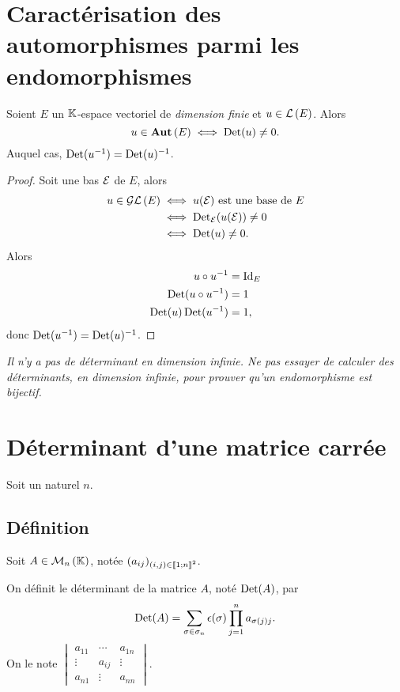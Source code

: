 \section{Caractérisation des automorphismes parmi les endomorphismes}
%
\begin{theo}
  Soient \(E\) un \(\mathbb{K}\)-espace vectoriel de \emph{dimension finie} et \(u\in
  \mathcal{L}\left(E\right)\). Alors
  \begin{equation}
    u \in \mathbf{Aut}\left(E\right) \iff \operatorname{Det}(u) \neq 0.
  \end{equation}
  Auquel cas, \(\operatorname{Det}(u^{-1}) = \operatorname{Det}(u)^{-1}\).
\end{theo}
\begin{proof}
  Soit une bas \(\mathcal{E}\) de \(E\), alors
  \begin{align}
    u \in \mathcal{GL}\left(E\right) &\iff u(\mathcal{E}) \text{~est une base de~} E \\
    &\iff \operatorname{Det}_{\mathcal{E}}(u(\mathcal{E})) \neq 0 \\
    &\iff \operatorname{Det}(u) \neq 0.
  \end{align}
  Alors
  \begin{align}
    u \circ u^{-1} &= \operatorname{Id}_E \\
    \operatorname{Det}(u \circ u^{-1}) &=1\\
    \operatorname{Det}(u) \operatorname{Det}(u^{-1}) &=1,
  \end{align}
  donc \(\operatorname{Det}(u^{-1}) = \operatorname{Det}(u)^{-1}\).
\end{proof}

\emph{\danger Il n'y a pas de déterminant en dimension infinie. Ne pas essayer
de calculer des déterminants, en dimension infinie, pour prouver qu'un
endomorphisme est bijectif.}

\section{Déterminant d'une matrice carrée}

Soit un naturel \(n\).
\subsection{Définition}

Soit \(A \in \mathcal{M}_{n}\left(\mathbb{K}\right)\), notée \((a_{ij})_{(i,j) \in
\mathopen{\llbracket}1\mathclose{}\mathpunct{};n\mathclose{\rrbracket}^2}\).
\begin{defdef}
  On définit le déterminant de la matrice \(A\), noté \(\operatorname{Det}(A)\), par
  \begin{equation}
    \operatorname{Det}(A) = \sum_{\sigma \in \sigma_n} \epsilon(\sigma) \prod_{j=1}^n
    a_{\sigma(j)j}.
  \end{equation}
  On le note \(\begin{vmatrix} a_{11} & \cdots & a_{1n} \\ \vdots & a_{ij} &
  \vdots \\ a_{n1} & \vdots & a_{nn}\end{vmatrix}\).
\end{defdef}

